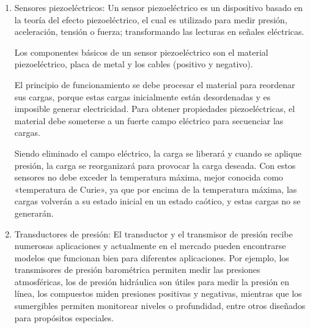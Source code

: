 \begin{enumerate}
\begin{enumerate}
			\begin{figure}[h]
				\centering
				\hfill
			\end{figure}
			
			\item Sensores piezoeléctricos: Un sensor piezoeléctrico es un dispositivo basado en la teoría del efecto piezoeléctrico, el cual es utilizado para medir presión, aceleración, tensión o fuerza; transformando las lecturas en señales eléctricas.
			
			Los componentes básicos de un sensor piezoeléctrico son el material piezoeléctrico, placa de metal y los cables (positivo y negativo).
			
			El principio de funcionamiento se debe procesar el material para reordenar sus cargas, porque estas cargas inicialmente están desordenadas y es imposible generar electricidad. Para obtener propiedades piezoeléctricas, el material debe someterse a un fuerte campo eléctrico para secuenciar las cargas.
			
			Siendo eliminado el campo eléctrico, la carga se liberará y cuando se aplique presión, la carga se reorganizará para provocar la carga deseada. Con estos sensores no debe exceder la temperatura máxima, mejor conocida como «temperatura de Curie», ya que por encima de la temperatura máxima, las cargas volverán a su estado inicial en un estado caótico, y estas cargas no se generarán. \cite{SensoresPiezoelectricos} \\
			
					\begin{figure}[h]
					\centering
					\hfill
				\end{figure}
			
			\item Transductores de presión: El transductor y el transmisor de presión recibe numerosas aplicaciones y actualmente en el mercado pueden encontrarse modelos que funcionan bien para diferentes aplicaciones. Por ejemplo, los transmisores de presión barométrica permiten medir las presiones atmosféricas, los de presión hidráulica son útiles para medir la presión en línea, los compuestos miden presiones positivas y negativas, mientras que los sumergibles permiten monitorear niveles o profundidad, entre otros diseñados para propósitos especiales. \cite{TransductorPresión} \\
			\\
			\begin{figure}[h]
				\centering
				\hfill
			\end{figure}
			

\end{enumerate}
\end{enumerate}
